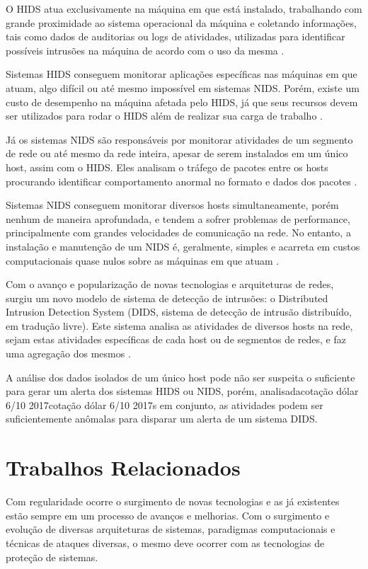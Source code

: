 \documentclass[openright]{normas-utf-tex} %
\begin{document}
	O HIDS atua exclusivamente na máquina em que está instalado, trabalhando com grande proximidade ao sistema operacional da máquina e coletando informações, tais como dados de auditorias ou logs de atividades, utilizadas para identificar possíveis intrusões na máquina de acordo com o uso da mesma \cite{testing}.
	
	Sistemas HIDS conseguem monitorar aplicações específicas nas máquinas em que atuam, algo difícil ou até mesmo impossível em sistemas NIDS. Porém, existe um custo de desempenho na máquina afetada pelo HIDS, já que seus recursos devem ser utilizados para rodar o HIDS além de realizar sua carga de trabalho \cite{cop}.
	
	Já os sistemas NIDS são responsáveis por monitorar atividades de um segmento de rede ou até mesmo da rede inteira, apesar de serem instalados em um único host, assim com o HIDS. Eles analisam o tráfego de pacotes entre os hosts procurando identificar comportamento anormal no formato e dados dos pacotes \cite{testing}.
	
	Sistemas NIDS conseguem monitorar diversos hosts simultaneamente, porém nenhum de maneira aprofundada, e tendem a sofrer problemas de performance, principalmente com grandes velocidades de comunicação na rede. No entanto, a instalação e manutenção de um NIDS é, geralmente, simples e acarreta em custos computacionais quase nulos sobre as máquinas em que atuam \cite{roleof}.
	
	Com o avanço e popularização de novas tecnologias e arquiteturas de redes, surgiu um novo modelo de sistema de detecção de intrusões: o Distributed Intrusion Detection System (DIDS, sistema de detecção de intrusão distribuído, em tradução livre). Este sistema analisa as atividades de diversos hosts na rede, sejam estas atividades específicas de cada host ou de segmentos de redes, e faz uma agregação dos mesmos \cite{didma}.
	
	A análise dos dados isolados de um único host pode não ser suspeita o suficiente para gerar um alerta dos sistemas HIDS ou NIDS, porém, analisadacotação dólar 6/10 2017cotação dólar 6/10 2017s em conjunto, as atividades podem ser suficientemente anômalas para disparar um alerta de um sistema DIDS.
	
	
\section{Trabalhos Relacionados}

Com regularidade ocorre o surgimento de novas tecnologias e as já existentes estão sempre em um processo de avanços e melhorias. Com o surgimento e evolução de diversas arquiteturas de sistemas, paradigmas computacionais e técnicas de ataques diversas, o mesmo deve ocorrer com as tecnologias de proteção de sistemas.
\end{document}
